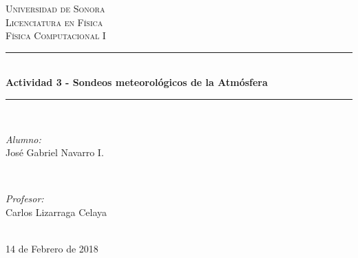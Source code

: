 \documentclass[12pt]{article}
\begin{document}
\begin{titlepage}

\newcommand{\HRule}{\rule{\linewidth}{0.5mm}} %

\center 

\textsc{\LARGE Universidad de Sonora}\\[1.5cm]
\textsc{\Large Licenciatura en Física}\\[0.5cm]
\textsc{\large Física Computacional I}\\[0.5cm]


\HRule \\[0.4cm]
{\huge \bfseries Actividad 3 - Sondeos meteorológicos de la Atmósfera}\\[0.4cm] %
\HRule \\[1.5cm]
 

\begin{minipage}{0.4\textwidth}
\begin{flushleft} \large
\emph{Alumno:}\\
José Gabriel Navarro I.
\end{flushleft}
\end{minipage}
~
\begin{minipage}{0.4\textwidth}
\begin{flushright} \large
\emph{Profesor:} \\
Carlos Lizarraga Celaya
\end{flushright}
\end{minipage}\\[2cm]


14 de Febrero de 2018



\end{titlepage}
\end{document}
